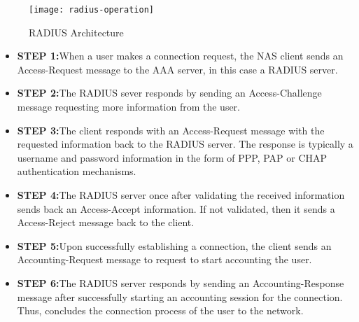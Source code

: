 \begin{figure}[H]
	\centering
	\texttt{[image: radius-operation]}
	\caption {RADIUS Architecture \cite{Radius_operation_img}}
	\label{fig:RADIUS_architecture}
	\vspace{-10pt}
\end{figure}

\begin{itemize}
	\item \textbf{STEP 1:}When a user makes a connection request, the NAS client sends an Access-Request message to the AAA server, in this case a RADIUS server.
	\item \textbf{STEP 2:}The RADIUS sever responds by sending an Access-Challenge message requesting more information from the user.
	\item \textbf{STEP 3:}The client responds with an Access-Request message with the requested information back to the RADIUS server. The response is typically a username and password information in the form of PPP, PAP or CHAP authentication mechanisms.
	\item \textbf{STEP 4:}The RADIUS server once after validating the received information sends back an Access-Accept information. If not validated, then it sends a Access-Reject message back to the client.
	\item \textbf{STEP 5:}Upon successfully establishing a connection, the client sends an Accounting-Request message to request to start accounting the user.
	\item \textbf{STEP 6:}The RADIUS server responds by sending an Accounting-Response message after successfully starting an accounting session for the connection. Thus, concludes the connection process of the user to the network.
	
\end{itemize}

